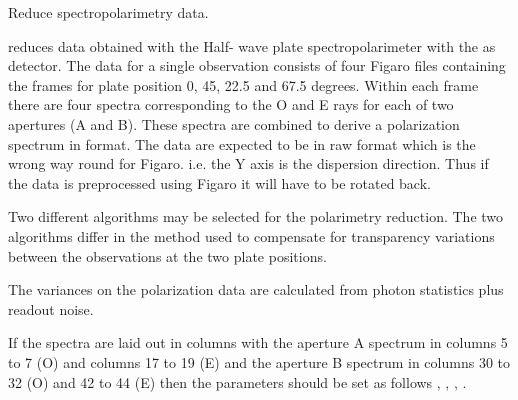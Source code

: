 \begin{manroutinedescription}
        Reduce {} spectropolarimetry data.

        {} reduces data obtained with the {} Half-%
wave plate
        spectropolarimeter with the {} as detector. The data for a
        single observation consists of four Figaro files containing the
        frames for plate position 0, 45, 22.5 and 67.5 degrees. Within each
        frame there are four spectra corresponding to the O and E rays for
        each of two apertures (A and B). These spectra are combined
        to derive a polarization spectrum in {} format.
        The {} data are expected to be in raw {} format %
which is
        the wrong way round for Figaro. i.e. the Y axis is the dispersion
        direction. Thus if the data is preprocessed using Figaro it will
        have to be rotated back.

        Two different algorithms may be selected for the polarimetry
        reduction. The two algorithms differ in the method used to
        compensate for transparency variations between the observations
        at the two plate positions.

        The variances on the polarization data are calculated from photon
        statistics plus readout noise.

        If the spectra are laid out in columns with the
        aperture A spectrum in columns 5 to 7 (O) and columns 17 to 19 (E)
        and the aperture B spectrum in columns 30 to 32 (O) and 42 to 44 (E)
        then the parameters should be set as follows {}, {%
},
        {}, {}.



\end{manroutinedescription}
